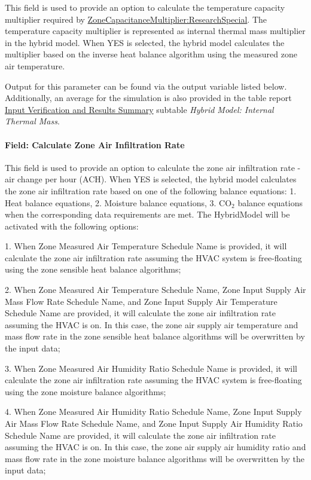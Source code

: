 This field is used to provide an option to calculate the temperature capacity multiplier required by \hyperref[zonecapacitancemultiplierresearchspecial]{ZoneCapacitanceMultiplier:ResearchSpecial}. The temperature capacity multiplier is represented as internal thermal mass multiplier in the hybrid model. When YES is selected, the hybrid model calculates the multiplier based on the inverse heat balance algorithm using the measured zone air temperature.

Output for this parameter can be found via the output variable listed below.  Additionally, an average for the simulation is also provided in the table report \hyperref[input-verification-and-results-summary-or-ivrs]{Input Verification and Results Summary} subtable \textit{Hybrid Model: Internal Thermal Mass}.

\paragraph{Field: Calculate Zone Air Infiltration Rate}\label{field-calculate-zone-air-infiltration-rate-hm}

This field is used to provide an option to calculate the zone air infiltration rate - air change per hour (ACH).
When YES is selected, the hybrid model calculates the zone air infiltration rate based on one of the following balance equations: 1. Heat balance equations, 2. Moisture balance equations, 3. CO$_2$ balance equations when the corresponding data requirements are met. The HybridModel will be activated with the following options:

1. When Zone Measured Air Temperature Schedule Name is provided, it will calculate the zone air infiltration rate assuming the HVAC system is free-floating using the zone sensible heat balance algorithms;

2. When Zone Measured Air Temperature Schedule Name, Zone Input Supply Air Mass Flow Rate Schedule Name, and Zone Input Supply Air Temperature Schedule Name are provided, it will calculate the zone air infiltration rate assuming the HVAC is on. In this case, the zone air supply air temperature and mass flow rate in the zone sensible heat balance algorithms will be overwritten by the input data;

3. When Zone Measured Air Humidity Ratio Schedule Name is provided, it will calculate the zone air infiltration rate assuming the HVAC system is free-floating using the zone moisture balance algorithms;

4. When Zone Measured Air Humidity Ratio Schedule Name, Zone Input Supply Air Mass Flow Rate Schedule Name, and Zone Input Supply Air Humidity Ratio Schedule Name are provided, it will calculate the zone air infiltration rate assuming the HVAC is on. In this case, the zone air supply air humidity ratio and mass flow rate in the zone moisture balance algorithms will be overwritten by the input data;

